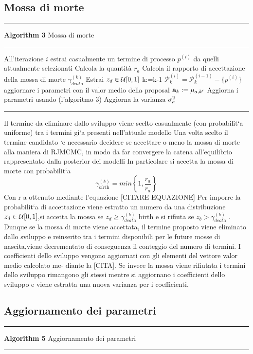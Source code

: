 \subsection{Mossa di morte}
\hrule 
\textbf{Algorithm 3} Mossa di morte
\hrule

\begin{algorithmic}
\State All'iterazione $i$ estrai casualmente un termine di processo $p^{(i)}$ da quelli attualmente  selezionati
\State Calcola la quantità $r_a$
\State Calcola il rapporto di accettazione della mossa di morte $\gamma_{\textit{death}}^{(k)}$
\State Estrai $z_d\in\mathcal{U}[0,1]$
\State k:=k-1
\State $ \mathcal{P}_k^{(i)}= \mathcal{P}_k^{(i-1)}- \{p^{(i)}\} $
\State aggiornare i parametri con il valor medio della proposal $\textbf{a}_k:=\mu_{a,k'}$
\Else
\State Aggiorna i parametri usando (l'algoritmo 3)
\State Aggiorna la varianza $\sigma_a^2$
\EndIf
\end{algorithmic}
\hrule
\vspace{2em}
Il termine da eliminare dallo sviluppo viene scelto casualmente (con probabilit`a
uniforme) tra i termini gi`a presenti nell’attuale modello
Una volta scelto il termine candidato `e necessario decidere se accettare o meno la
mossa di morte alla maniera di RJMCMC, in modo da far convergere la catena
all’equilibrio rappresentato dalla posterior dei modelli
In particolare si accetta la mossa di morte con probabilit`a
\begin{equation}
\gamma_{\textit{birth}}^{(k)}=min\left\lbrace 1,\frac{r_a}{r_a}\right\rbrace
\end{equation}
Con r a ottenuto mediante l’equazione [CITARE EQUAZIONE]
Per imporre la probabilit`a di accettazione viene estratto un numero da una distribuzione
 $z_d\in\mathcal{U}[0,1]$,si accetta la
mossa se $z_d\geq \gamma_{\textit{death}}^{(k)}$ birth e si rifiuta se $z_b> \gamma_{\textit{death}}^{(k)}$ .
Dunque se la mossa di morte viene accettata, il termine proposto viene eliminato
dallo sviluppo e reinserito tra i termini disponibili per le future mosse di nascita,viene
decrementato di conseguenza il conteggio del numero di termini. I coefficienti dello
sviluppo vengono aggiornati con gli elementi del vettore valor medio calcolato me-
diante la [CITA].
Se invece la mossa viene rifiutata i termini dello sviluppo rimangono gli stessi mentre
si aggiornano i coefficienti dello sviluppo e viene estratta una nuova varianza per i
coefficienti.
\subsection{Aggiornamento dei parametri}
\hrule 
\textbf{Algorithm 5} Aggiornamento dei parametri
\hrule

